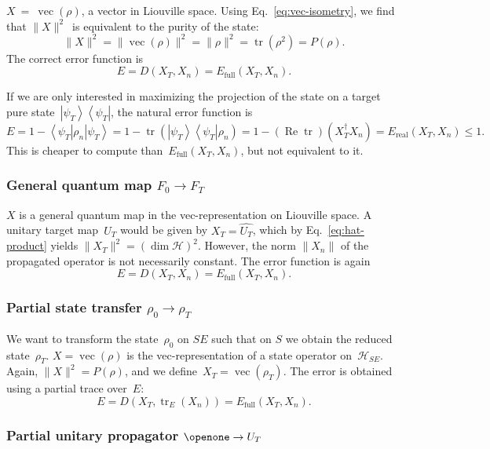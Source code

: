 \documentclass[aps, pra, a4paper, longbibliography, superscriptaddress]{revtex4-1}
\newcommand{\I}{\openone}
\newcommand{\be}{\begin{equation}}
\newcommand{\ee}{\end{equation}}
\newcommand{\ket}[1]{\left| #1 \right \rangle}
\newcommand{\bra}[1]{\left \langle #1 \right|}
\newcommand{\ketbra}[2]{\left| #1 \right \rangle \left \langle #2 \right|}
\newcommand{\hilb}[1]{\mathcal{#1}}
\DeclareMathOperator{\tr}{tr}
\DeclareMathOperator{\re}{Re}
\DeclareMathOperator{\cvec}{vec}
\newcommand{\vecop}[1]{\widehat{#1}}
\newcommand{\Xt}{X_T}  %
\newcommand{\Xo}{X_0}  %
\newcommand{\Xn}{X_n}  %
\begin{document}
$X~=~\cvec(\rho)$, a vector in Liouville space.
Using Eq.~\eqref{eq:vec-isometry}, we find that
$\|X\|^2$~is equivalent to the purity of the state:
\be
\|X\|^2
= \|\cvec(\rho)\|^2
= \|\rho\|^2
= \tr(\rho^2)
= P(\rho).
\ee
The correct error function is
\be
E
= D(\Xt, \Xn)
= E_\text{full}(\Xt, \Xn).
\ee

If we are only interested in maximizing the projection of
the state on a target pure state~$\ketbra{\psi_T}{\psi_T}$, the natural error
function is
\be
E
= 1 -\bra{\psi_T} \rho_n \ket{\psi_T}
= 1 -\tr\left(\ketbra{\psi_T}{\psi_T} \rho_n \right)
= 1 -(\re \tr)\left(\Xt^\dagger \Xn\right)
= E_\text{real}(\Xt, \Xn) \le 1.
\ee
This is cheaper to compute than~$E_\text{full}(\Xt, \Xn)$, but not equivalent to it.


\subsubsection{General quantum map $F_0 \to F_T$}

$X$ is a general quantum map in the vec-representation on Liouville space.
A unitary target map~$U_T$ would be given by
$\Xt = \vecop{U_T}$, which by Eq.~\eqref{eq:hat-product}
yields $\|\Xt\|^2 = (\dim \hilb{H})^2$.
However, the norm $\|\Xn\|$ of the propagated operator
is not necessarily constant. The error function is again
\be
E
= D(\Xt, \Xn)
= E_\text{full}(\Xt, \Xn).
\ee


\subsubsection{Partial state transfer $\rho_0 \to \rho_T$}

We want to transform the state~$\rho_0$ on $SE$ such that
on $S$ we obtain the reduced state~$\rho_T$.
$X = \cvec(\rho)$ is the vec-representation of a state operator on~$\hilb{H}_{SE}$.
Again, $\|X\|^2 = P(\rho)$,
and we define~$\Xt = \cvec(\rho_T)$.
The error is obtained using a partial trace over~$E$:
\be
E
= D(\Xt, \tr_E(\Xn))
= E_\text{full}(\Xt, \Xn).
\ee


\subsubsection{Partial unitary propagator $\I \to U_T$}
\end{document}
